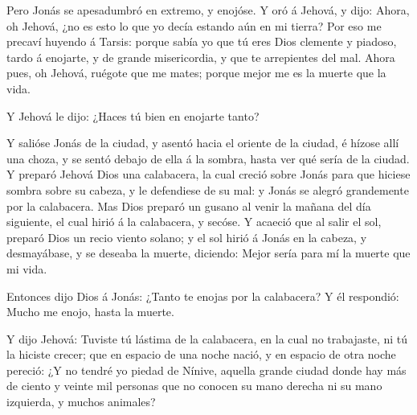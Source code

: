  Pero Jonás se apesadumbró en extremo, y enojóse.
 Y oró á Jehová, y dijo: Ahora, oh Jehová, ¿no es esto lo
que yo decía estando aún en mi tierra? Por eso me precaví huyendo á
Tarsis: porque sabía yo que tú eres Dios clemente y piadoso, tardo á
enojarte, y de grande misericordia, y que te arrepientes del mal.
 Ahora pues, oh Jehová, ruégote que me mates; porque mejor
me es la muerte que la vida.

 Y Jehová le dijo: ¿Haces tú bien en enojarte tanto?

 Y salióse Jonás de la ciudad, y asentó hacia el oriente
de la ciudad, é hízose allí una choza, y se sentó debajo de ella á la
sombra, hasta ver qué sería de la ciudad.  Y preparó
Jehová Dios una calabacera, la cual creció sobre Jonás para que hiciese
sombra sobre su cabeza, y le defendiese de su mal: y Jonás se alegró
grandemente por la calabacera.  Mas Dios preparó un gusano
al venir la mañana del día siguiente, el cual hirió á la calabacera, y
secóse.  Y acaeció que al salir el sol, preparó Dios un
recio viento solano; y el sol hirió á Jonás en la cabeza, y desmayábase,
y se deseaba la muerte, diciendo: Mejor sería para mí la muerte que mi
vida.

 Entonces dijo Dios á Jonás: ¿Tanto te enojas por la
calabacera? Y él respondió: Mucho me enojo, hasta la muerte.

 Y dijo Jehová: Tuviste tú lástima de la calabacera, en
la cual no trabajaste, ni tú la hiciste crecer; que en espacio de una
noche nació, y en espacio de otra noche pereció:  ¿Y no
tendré yo piedad de Nínive, aquella grande ciudad donde hay más de
ciento y veinte mil personas que no conocen su mano derecha ni su mano
izquierda, y muchos animales?
